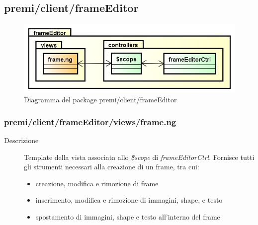 \clearpage
\subsection{premi/client/frameEditor}
\begin{figure}[H]
\begin{center}
\includegraphics[scale=0.85]{img/diapkg/frameEditor.png}
\caption{Diagramma del package premi/client/frameEditor}
\end{center}
\end{figure}

\subsubsection{premi/client/frameEditor/views/frame.ng}

\begin{description}
\item[Descrizione] \hfill
	Template della vista associata allo \textit{\$scope} di \textit{frameEditorCtrl}. Fornisce tutti gli strumenti necessari alla creazione di un frame, tra cui:
	\begin{itemize}
			\item creazione, modifica e rimozione di frame
			\item inserimento, modifica e rimozione di immagini, shape, e testo
			\item spostamento di immagini, shape  e testo all'interno del frame
	\end{itemize}
\end{description}








